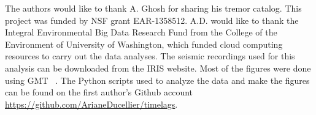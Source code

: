 \documentclass[draft]{agujournal2019}
\begin{document}
%
%

%

%




%
%
%
%
%
%
%
%


\acknowledgments
The authors would like to thank A. Ghosh for sharing his tremor catalog. This project was funded by NSF grant EAR-1358512. A.D. would like to thank the Integral Environmental Big Data Research Fund from the College of the Environment of University of Washington, which funded cloud computing resources to carry out the data analyses. The seismic recordings used for this analysis can be downloaded from the IRIS website. Most of the figures were done using GMT ~\cite{WES_1991}. The Python scripts used to analyze the data and make the figures can be found on the first author's Github account \url{https://github.com/ArianeDucellier/timelags}.
\end{document}
